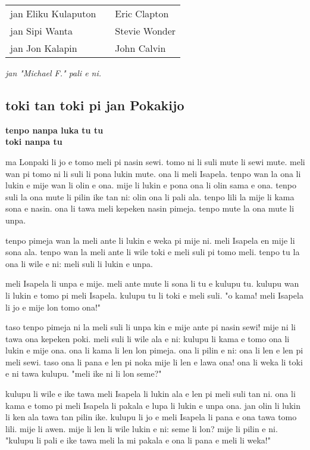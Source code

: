 \begin{supertabular}{p{5,5cm}|ll}
jan Eliku Kulaputon &&  Eric Clapton \\ 
jan Sipi Wanta  && Stevie Wonder \\ 
jan Jon Kalapin && John Calvin \\  
\end{supertabular}

\textit{jan "Michael F." pali e ni. \cite{www:failbluedot:01}}
%
\newpage
\subsection{toki tan toki pi jan Pokakijo}

\textbf{tenpo nanpa luka tu tu \\
toki nanpa tu}

ma Lonpaki li jo e tomo meli pi nasin sewi.
tomo ni li suli mute li sewi mute.
meli wan pi tomo ni li suli li pona lukin mute.
ona li meli Isapela.
tenpo wan la ona li lukin e mije wan li olin e ona.
mije li lukin e pona ona li olin sama e ona.
tenpo suli la ona mute li pilin ike tan ni: olin ona li pali ala.
tenpo lili la mije li kama sona e nasin.
ona li tawa meli kepeken nasin pimeja.
tenpo mute la ona mute li unpa.

tenpo pimeja wan la meli ante li lukin e weka pi mije ni.
meli Isapela en mije li sona ala.
tenpo wan la meli ante li wile toki e meli suli pi tomo meli.
tenpo tu la ona li wile e ni: meli suli li lukin e unpa.

meli Isapela li unpa e mije.
meli ante mute li sona li tu e kulupu tu.
kulupu wan li lukin e tomo pi meli Isapela.
kulupu tu li toki e meli suli.
"o kama!
meli Isapela li jo e mije lon tomo ona!"

taso tenpo pimeja ni la meli suli li unpa kin e mije ante pi nasin sewi!
mije ni li tawa ona kepeken poki.
meli suli li wile ala e ni: kulupu li kama e tomo ona li lukin e mije ona.
ona li kama li len lon pimeja.
ona li pilin e ni: ona li len e len pi meli sewi.
taso ona li pana e len pi noka mije li len e lawa ona!
ona li weka li toki e ni tawa kulupu.
"meli ike ni li lon seme?"

kulupu li wile e ike tawa meli Isapela li lukin ala e len pi meli suli tan ni.
ona li kama e tomo pi meli Isapela li pakala e lupa li lukin e unpa ona.
jan olin li lukin li ken ala tawa tan pilin ike.
kulupu li jo e meli Isapela li pana e ona tawa tomo lili.
mije li awen.
mije li len li wile lukin e ni: seme li lon?
mije li pilin e ni.
"kulupu li pali e ike tawa meli la mi pakala e ona li pana e meli li weka!"

